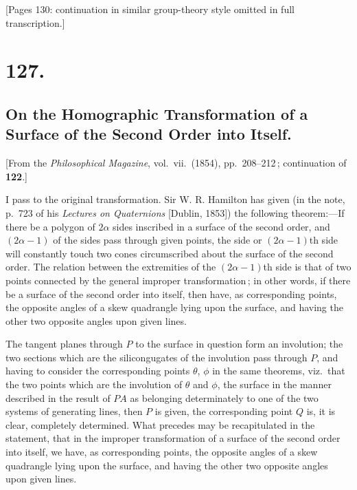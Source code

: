 \documentclass[11pt,a4paper]{book}
\begin{document}
\bigskip

[Pages 130: continuation in similar group-theory style omitted in full transcription.]

\medskip

\section*{127.}
\subsection*{On the Homographic Transformation of a Surface of the Second Order into Itself.}

[From the \textit{Philosophical Magazine}, vol.\ vii.\ (1854), pp.\ 208--212\,; continuation of \textbf{122}.]

\medskip

I pass to the original transformation. Sir W. R. Hamilton has given (in the note,
p.\ 723 of his \textit{Lectures on Quaternions} [Dublin, 1853]) the following theorem:---If there
be a polygon of $2\alpha$ sides inscribed in a surface of the second order, and $(2\alpha-1)$ of
the sides pass through given points, the side or $(2\alpha-1)$th side will constantly touch two
cones circumscribed about the surface of the second order. The relation between the
extremities of the $(2\alpha-1)$th side is that of two points connected by the general improper
transformation\,; in other words, if there be a surface of the second order into itself, then
have, as corresponding points, the opposite angles of a skew quadrangle lying upon
the surface, and having the other two opposite angles upon given lines.

\medskip

The tangent planes through $P$ to the surface in question form an involution; the
two sections which are the silicongugates of the involution pass through $P$, and
having to consider the corresponding points $\theta$, $\phi$ in the same theorems, viz.\ that the
two points which are the involution of $\theta$ and $\phi$, the surface in the manner
described in the result of $PA$ as belonging determinately to one of the two
systems of generating lines, then $P$ is given, the corresponding point $Q$ is, it
is clear, completely determined. What precedes may be recapitulated in the statement,
that in the improper transformation of a surface of the second order into itself, we
have, as corresponding points, the opposite angles of a skew quadrangle lying upon
the surface, and having the other two opposite angles upon given lines.
\end{document}
